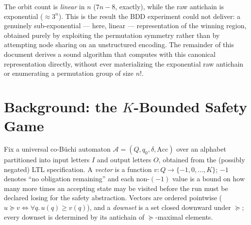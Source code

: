 \documentclass[11pt]{article}
\newcommand{\Aut}{\mathcal{A}}
\newcommand{\Q}{Q}
\newcommand{\dom}{\succeq}
\begin{document}
The orbit count is \emph{linear} in $n$ ($7n-8$, exactly), while the raw
antichain is exponential ($\approx 3^n$). This is the result the BDD
experiment could not deliver: a genuinely sub-exponential --- here, linear
--- representation of the winning region, obtained purely by exploiting the
permutation symmetry rather than by attempting node sharing on an
unstructured encoding. The remainder of this document derives a sound
algorithm that computes with this canonical representation directly,
without ever materializing the exponential raw antichain or enumerating a
permutation group of size $n!$.

\section{Background: the $K$-Bounded Safety Game}
\label{sec:background}

Fix a universal co-B\"uchi automaton $\Aut = (\Q, q_0, \delta, \mathrm{Acc})$
over an alphabet partitioned into input letters $I$ and output letters $O$,
obtained from the (possibly negated) LTL specification. A \emph{vector} is a
function $v : \Q \to \{-1, 0, \dots, K\}$; $-1$ denotes ``no obligation
remaining'' and each non-$(-1)$ value is a bound on how many more times an
accepting state may be visited before the run must be declared losing for
the safety abstraction. Vectors are ordered pointwise
($u \dom v \iff \forall q.\, u(q) \geq v(q)$), and a \emph{downset} is a set
closed downward under $\dom$; every downset is determined by its antichain
of $\dom$-maximal elements.
\end{document}
